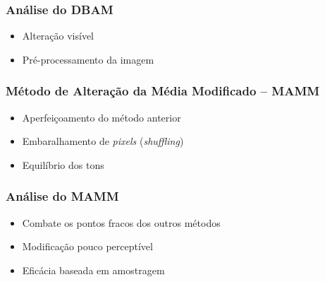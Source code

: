 \documentclass{beamer}
\begin{document}
\begin{frame}
\frametitle{Análise do DBAM}

\begin{itemize}
\item Alteração visível \newline
\item Pré-processamento da imagem \newline
\end{itemize}
\end{frame}


\begin{frame}
\frametitle{Método de Alteração da Média Modificado -- MAMM}

\begin{itemize}
\item Aperfeiçoamento do método anterior \newline
\item Embaralhamento de \textit{pixels} (\textit{shuffling}) \newline
\item Equilíbrio dos tons
\end{itemize}

\end{frame}

\begin{frame}
\frametitle{Análise do MAMM}

\begin{itemize}
\item Combate os pontos fracos dos outros métodos \newline
\item Modificação pouco perceptível \newline
\item Eficácia baseada em amostragem
\end{itemize}

\end{frame}

\end{document}
